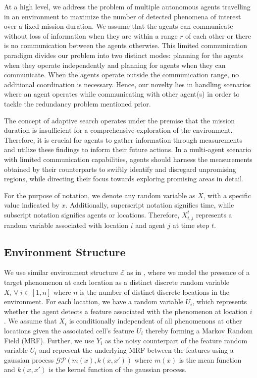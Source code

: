 \documentclass[letterpaper, 10 pt, conference]{IEEEConference}
\begin{document}
At a high level, we address the problem of multiple autonomous agents travelling in an environment to maximize the number of detected phenomena of interest over a fixed mission duration. We assume that the agents can communicate without loss of information when they are within a range $r$ of each other or there is no communication between the agents otherwise. This limited communication paradigm divides our problem into two distinct modes: planning for the agents when they operate independently and planning for agents when they can communicate. When the agents operate outside the communication range, no additional coordination is necessary. Hence, our novelty lies in handling scenarios where an agent operates while communicating with other agent(s) in order to tackle the redundancy problem mentioned prior.

The concept of adaptive search operates under the premise that the mission duration is insufficient for a comprehensive exploration of the environment. Therefore, it is crucial for agents to gather information through measurements and utilize these findings to inform their future actions. In a multi-agent scenario with limited communication capabilities, agents should harness the measurements obtained by their counterparts to swiftly identify and disregard unpromising regions, while directing their focus towards exploring promising areas in detail. 

For the purpose of notation, we denote any random variable as $X$, with a specific value indicated by $x$. Additionally, superscript notation signifies time, while subscript notation signifies agents or locations. Therefore, $X_{i,j}^t$ represents a random variable associated with location $i$ and agent $j$ at time step $t$.

\subsection{Environment Structure}
We use similar environment structure $\mathcal{E}$ as in \cite{ayton2017}, where we model the presence of a target phenomenon at each location as a distinct discrete random variable $X_i \; \forall \; i \in [1, n]$ where $n$ is the number of distinct discrete locations in the environment. For each location, we have a random variable $U_i$, which represents whether the agent detects a feature associated with the phenomenon at location $i$. We assume that $X_i$ is conditionally independent of all phenomenons at other locations given the associated cell's feature $U_i$ thereby forming a Markov Random Field (MRF). Further, we use $Y_i$ as the noisy counterpart of the feature random variable $U_i$ and represent the underlying MRF between the features using a gaussian process $\mathcal{GP}(m(x), k(x,x'))$ where $m(x)$ is the mean function and $k(x, x')$ is the kernel function of the gaussian process. 
\end{document}
